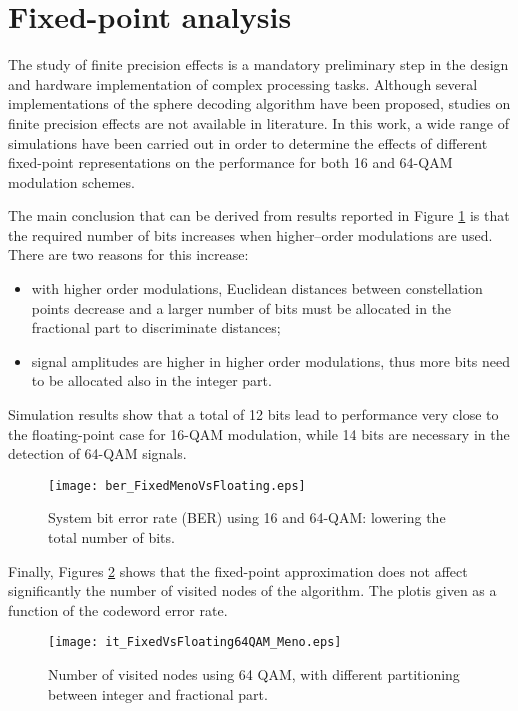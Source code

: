 \documentclass[12pt,onecolumn,draftclsnofoot]{IEEEtran}
\begin{document}
\section{Fixed-point analysis}
\label{FIX}
The study of finite precision effects is a mandatory preliminary step in the
design and hardware implementation of complex processing tasks.
Although several implementations of the sphere decoding algorithm have been
proposed, studies on finite precision effects are not available in literature.
In this work, a wide range of simulations have been carried out in order to determine the
effects of different fixed-point representations
on the performance for both 16 and 64-QAM modulation schemes.

The main conclusion that can be derived from 
results reported in Figure \ref{BER_Meno} is that the
required number of bits increases when
higher--order modulations are used. There are two reasons for
this increase:
\begin{itemize}
\item with higher order modulations, Euclidean distances between
constellation points decrease and a larger number of bits must be 
allocated in the fractional part to discriminate distances; 
\item signal amplitudes are higher in higher order modulations, 
thus more bits need to be allocated also in the integer part.
\end{itemize}
Simulation results show that a total of 12 bits lead to performance 
very close to the floating-point case for 16-QAM modulation,
while 14 bits are necessary in the detection of 64-QAM signals.
\begin{figure}[ht]
    \begin{center}
    \texttt{[image: ber\_FixedMenoVsFloating.eps]}
    \caption{System bit error rate (BER) using 16 and 64-QAM: lowering the total number of bits.}
    \label{BER_Meno}
    \end{center}
\end{figure}





Finally, Figures \ref{IT_64QAM_16} shows that the
fixed-point approximation does not affect significantly the number
of visited nodes of the algorithm. The plotis given as a function of the codeword error rate.
\begin{figure}[ht]
    \begin{center}
    \texttt{[image: it\_FixedVsFloating64QAM\_Meno.eps]}
    \caption{Number of visited nodes using 64 QAM, with different partitioning between integer and fractional part.}
    \label{IT_64QAM_16}
    \end{center}
\end{figure}
\end{document}
